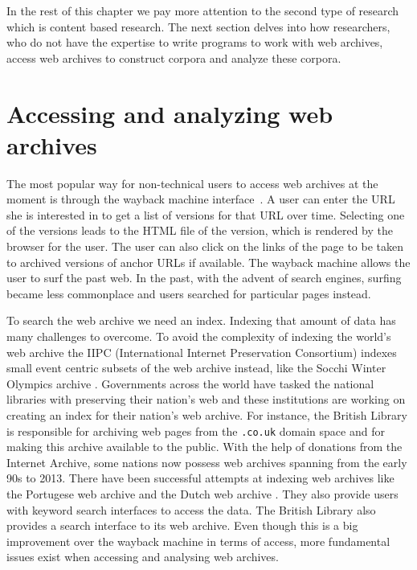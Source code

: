 In the rest of this chapter we pay more attention to the second type of research which is content based research. The next section delves into how researchers, who do not have the expertise to write programs to work with web archives, access web archives to construct corpora and analyze these corpora.


\section{Accessing and analyzing web archives} %
\label{sec:problems_faced_by_humanities_researchers}


The most popular way for non-technical users to access web archives at the moment is through the wayback machine interface~\cite{wayback}. A user can enter the URL she is interested in to get a list of versions for that URL over time. Selecting one of the versions leads to the HTML file of the version, which is rendered by the browser for the user. The user can also click on the links of the page to be taken to archived versions of anchor URLs if available. The wayback machine allows the user to surf the past web. In the past, with the advent of search engines, surfing became less commonplace and users searched for particular pages instead. 

To search the web archive we need an index. Indexing that amount of data has many challenges to overcome. To avoid the complexity of indexing the world's web archive the IIPC (International Internet Preservation Consortium) indexes small event centric subsets of the web archive instead, like the Socchi Winter Olympics archive \cite{socchi}. Governments across the world have tasked the national libraries with preserving their nation's web and these institutions are working on creating an index for their nation's web archive. For instance, the British Library is responsible for archiving web pages from the \texttt{.co.uk} domain space and for making this archive available to the public. With the help of donations from the Internet Archive, some nations now possess web archives spanning from the early 90s to 2013. There have been successful attempts at indexing web archives like the Portugese web archive \cite{pta} and the Dutch web archive \cite{nla}. They also provide users with keyword search interfaces to access the data. The British Library also provides a search interface to its web archive. Even though this is a big improvement over the wayback machine in terms of access, more fundamental issues exist when accessing and analysing web archives.



